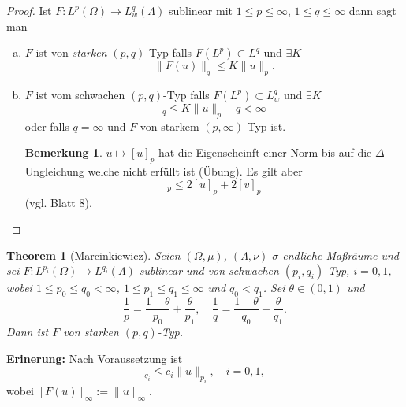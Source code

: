 \documentclass[
paper=a4,
bibtotocnumbered,
liststotocnumbered,
tablecaptionabove,
pointlessnumbers,
twoside,
openright,
10pt
]
{report}
\newtheorem{thm}{Theorem}[chapter]
\theoremstyle{definition}
\newtheorem*{rem}{Bemerkung}
\numberwithin{equation}{chapter}
\begin{document}
\begin{proof}
Ist $F: L^p(\Omega) \to L_w^q(\Lambda)$ sublinear mit $1\le p \le \infty$, $1\le q \le \infty$ dann sagt man
\begin{enumerate}[(a)]
\item $F$ ist von \emph{starken} $(p,q)$-Typ falls $F(L^p) \subset L^q$ und $\exists K$
\begin{equation}
\| F(u)\|_q \le K \|u\|_p.
\end{equation}
\item $F$ ist vom schwachen $(p,q)$-Typ falls $F(L^p) \subset L_w^q$ und $\exists K$
\begin{equation}
[F(u)]_q \le K \|u\|_p \quad q <\infty
\end{equation}
oder falls $q=\infty$ und $F$ von starkem $(p,\infty)$-Typ ist.
\begin{rem}
$u\mapsto [u]_p$ hat die Eigenscheinft einer Norm bis auf die $\Delta$-Ungleichung welche nicht erfüllt ist (Übung). Es gilt aber 
\begin{equation}
[u+v]_p \le 2[u]_p + 2[v]_p
\end{equation}
(vgl. Blatt 8).
\end{rem}
\end{enumerate}
\end{proof}

\begin{thm}[Marcinkiewicz]
Seien $(\Omega, \mu)$, $(\Lambda, \nu)$ $\sigma$-endliche Maßräume und sei $F: L^{p_i}(\Omega) \to L^{q_i}(\Lambda)$ sublinear und von schwachen $(p_i, q_i)$-Typ, $i=0,1$, wobei $1\le p_0 \le q_0 <\infty$,  $1\le p_1\le q_1\le \infty$ und $q_0<q_1$.  Sei $\theta\in (0,1)$ und
\begin{equation}
\frac{1}{p} = \frac{1-\theta}{p_0} + \frac{\theta}{p_1}, \quad \frac{1}{q} = \frac{1-\theta}{q_0} + \frac{\theta}{q_1}.
\end{equation}
Dann ist $F$ von starken $(p,q)$-Typ.
\end{thm}
\textbf{Erinerung:} Nach Voraussetzung ist
\begin{equation}
[F(u)]_{q_i} \le c_i \| u\|_{p_i}, \quad i=0,1,
\end{equation}
wobei $[F(u)]_\infty:= \| u\|_\infty$.
\end{document}
